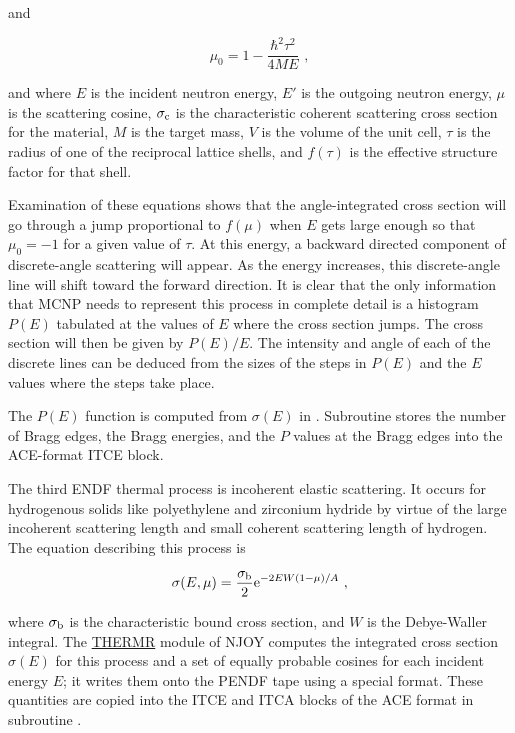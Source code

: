 \noindent
and

\begin{equation}
   \mu_0=1-\frac{\hbar^2\tau^2}{4ME}\,\,,
\end{equation}

\noindent
and where $E$ is the incident neutron energy, $E'$ is the outgoing
neutron energy, $\mu$ is the scattering cosine, $\sigma_{\rm c}$ is
the characteristic coherent scattering cross section
 for the material, $M$ is the target
mass, $V$ is the volume of the unit cell, $\tau$ is the radius
of one of the reciprocal lattice shells, and $f(\tau)$ is the
effective structure factor for that shell.

Examination of these equations shows that the angle-integrated
cross section will go through a jump proportional to $f(\mu)$ when
$E$ gets large enough so that $\mu_0=-1$ for a given value of $\tau$.
At this energy, a backward directed component of discrete-angle
scattering will appear.  As the energy increases, this discrete-angle
line will shift toward the forward direction.  It is clear that the
only information that MCNP needs to represent this process in
complete detail is a histogram $P(E)$ tabulated at the values of $E$
where the cross section jumps.  The cross section will then be given
by $P(E)/E$.  The intensity and angle of each of the discrete lines
can be deduced from the sizes of the steps in $P(E)$ and the $E$
values where the steps take place.

The $P(E)$ function is computed from $\sigma(E)$ in .
Subroutine  stores the number of Bragg edges, the Bragg
energies, and the $P$ values at the Bragg edges into the ACE-format
ITCE block.

The third ENDF thermal process is incoherent elastic scattering.
It occurs for hydrogenous solids like polyethylene and
zirconium hydride by virtue of the large incoherent scattering length
and small coherent scattering length of hydrogen.  The equation
describing this process is

\begin{equation}
  \sigma(E,\mu)=\frac{\sigma_{\rm b}}{2}
   {\rm e}^{-2EW(1-\mu)/A}\,\,,
\end{equation}

\noindent
where $\sigma_{\rm b}$ is the characteristic bound cross section, and
$W$ is the Debye-Waller integral.  The \hyperlink{sTHERMRhy}{THERMR}
module of NJOY computes the integrated cross
section $\sigma(E)$ for this process and a set of equally
probable cosines
for each incident energy $E$; it writes them onto the PENDF tape using
a special format.  These quantities are copied into the ITCE and ITCA
blocks of the ACE format in subroutine .

